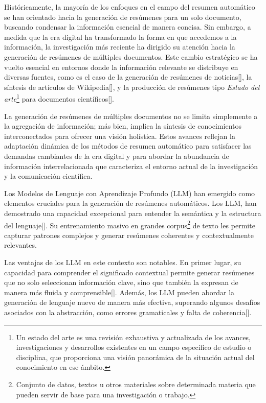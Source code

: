    Históricamente, la mayoría de los enfoques en el campo del resumen automático se han orientado hacia la generación de resúmenes para un solo documento, buscando condensar la información esencial de manera concisa. Sin embargo, a medida que la era digital ha transformado la forma en que accedemos a la información, la investigación más reciente ha dirigido su atención hacia la generación de resúmenes de múltiples documentos. Este cambio estratégico se ha vuelto esencial en entornos donde la información relevante se distribuye en diversas fuentes, como es el caso de la generación de resúmenes de noticias[\cite{fabbri2019multi-news}], la síntesis de artículos de Wikipedia[\cite{liu2018}], y la producción de resúmenes tipo \emph{Estado del arte}\footnote{Un estado del arte es una revisión exhaustiva y actualizada de los avances, investigaciones y desarrollos existentes en un campo específico de estudio o disciplina, que proporciona una visión panorámica de la situación actual del conocimiento en ese ámbito. } para documentos científicos[\cite{lu2020multixscience}].

    La generación de resúmenes de múltiples documentos no se limita simplemente a la agregación de información; más bien, implica la síntesis de conocimientos interconectados para ofrecer una visión holística. 
    Estos avances reflejan la adaptación dinámica de los métodos de resumen automático para satisfacer las demandas cambiantes de la era digital y para abordar la abundancia de información interrelacionada que caracteriza el entorno actual de la investigación y la comunicación científica.

    Los Modelos de Lenguaje con Aprendizaje Profundo (LLM) han emergido como elementos cruciales para la generación de resúmenes automáticos. Los LLM, han demostrado una capacidad excepcional para entender la semántica y la estructura del lenguaje[\cite{fewshot}]. Su entrenamiento masivo en grandes corpus\footnote{Conjunto de datos, textos u otros materiales sobre determinada materia que pueden servir de base para una investigación o trabajo.} de texto les permite capturar patrones complejos y generar resúmenes coherentes y contextualmente relevantes.

    Las ventajas de los LLM en este contexto son notables. En primer lugar, su capacidad para comprender el significado contextual permite generar resúmenes que no solo seleccionan información clave, sino que también la expresan de manera más fluida y comprensible[\cite{Radford2018ImprovingLU}]. Además, los LLM pueden abordar la generación de lenguaje nuevo de manera más efectiva, superando algunos desafíos asociados con la abstracción, como errores gramaticales y falta de coherencia[\cite{RoBERTa}].

